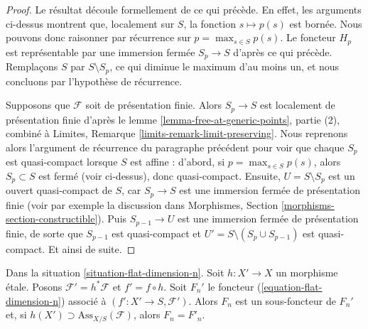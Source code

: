 \begin{proof}
\medskip\noindent
Le résultat découle formellement de ce qui précède.
En effet, les arguments ci-dessus montrent que, localement sur $S$, la fonction
$s \mapsto p(s)$ est bornée. Nous pouvons donc raisonner par récurrence
sur $p = \max_{s \in S} p(s)$. Le foncteur $H_p$ est représentable
par une immersion fermée $S_p \to S$ d'après ce qui précède. Remplaçons $S$ par
$S \setminus S_p$, ce qui diminue le maximum d'au moins un, et
nous concluons par l'hypothèse de récurrence.

\medskip\noindent
Supposons que $\mathcal{F}$ soit de présentation finie.
Alors $S_p \to S$ est localement de présentation finie d'après le
lemme \ref{lemma-free-at-generic-points}, partie (2), combiné à
Limites, Remarque \ref{limits-remark-limit-preserving}.
Nous reprenons alors l'argument de récurrence du paragraphe précédent pour
voir que chaque $S_p$ est quasi-compact lorsque $S$ est affine :
d'abord, si $p = \max_{s \in S} p(s)$, alors $S_p \subset S$
est fermé (voir ci-dessus), donc quasi-compact. Ensuite, $U = S \setminus S_p$
est un ouvert quasi-compact de $S$, car $S_p \to S$ est une immersion
fermée de présentation finie (voir par exemple la discussion dans Morphismes, Section
\ref{morphisms-section-constructible}). Puis $S_{p - 1} \to U$
est une immersion fermée de présentation finie, de sorte que $S_{p - 1}$
est quasi-compact et $U' = S \setminus (S_p \cup S_{p - 1})$
est quasi-compact. Et ainsi de suite.
\end{proof}

\begin{lemma}
\label{lemma-localize-flat-dimension-n}
Dans la situation \ref{situation-flat-dimension-n}.
Soit $h : X' \to X$ un morphisme \'etale.
Posons $\mathcal{F}' = h^*\mathcal{F}$ et $f' = f \circ h$.
Soit $F_n'$ le foncteur (\ref{equation-flat-dimension-n})
associé à $(f' : X' \to S, \mathcal{F}')$.
Alors $F_n$ est un sous-foncteur de $F_n'$ et, si
$h(X') \supset \text{Ass}_{X/S}(\mathcal{F})$, alors $F_n = F'_n$.
\end{lemma}

